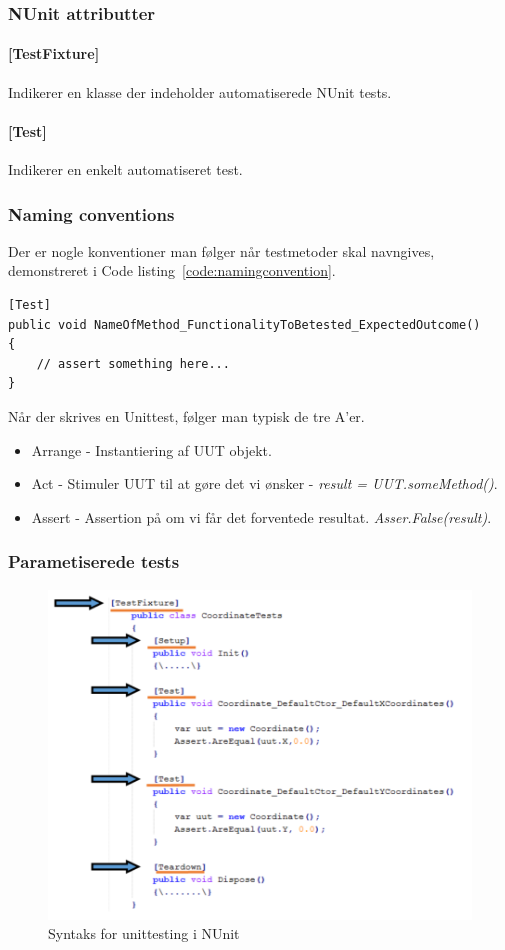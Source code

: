 \subsubsection{NUnit attributter}

\paragraph{[TestFixture]} Indikerer en klasse der indeholder automatiserede NUnit tests. 
\paragraph{[Test]} Indikerer en enkelt automatiseret test.

\subsubsection{Naming conventions}
Der er nogle konventioner man følger når testmetoder skal navngives, demonstreret i Code listing~\ref{code:namingconvention}.

\begin{lstlisting}[caption=Eksempel på navngivnings konvention for test.,label=code:namingconvention]
[Test]
public void NameOfMethod_FunctionalityToBetested_ExpectedOutcome()
{
	// assert something here...
}
\end{lstlisting}

Når der skrives en Unittest, følger man typisk de tre A'er.

\begin{itemize}
	\item Arrange - Instantiering af UUT objekt.
	\item Act - Stimuler UUT til at gøre det vi ønsker - \textit{result = UUT.someMethod()}.
	\item Assert - Assertion på om vi får det forventede resultat. \textit{Asser.False(result)}.
\end{itemize}

\subsubsection{Parametiserede tests}


\begin{figure}[H]
\centering
\includegraphics[width=0.7\linewidth]{figs/testFixture.PNG}
\caption{Syntaks for unittesting i NUnit}
\label{fig:testFixture}
\end{figure}

